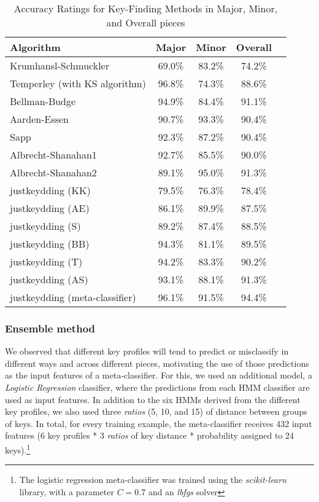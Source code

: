 \documentclass[sigconf]{acmart}
\begin{document}
\begin{table}[ht]
  \caption{Accuracy Ratings for Key-Finding Methods in Major, Minor, and Overall pieces}
  \label{tab:results}
  \begin{tabular}{lcccc}
    \toprule
    Algorithm & Major & Minor & Overall\\
    \midrule
    Krumhansl-Schmuckler & 69.0\% & 83.2\% & 74.2\%\\
    Temperley (with KS algorithm) & 96.8\% & 74.3\% & 88.6\%\\
    Bellman-Budge & 94.9\% & 84.4\% & 91.1\%\\
    Aarden-Essen & 90.7\% & 93.3\% & 90.4\%\\
    Sapp & 92.3\% & 87.2\% & 90.4\%\\
    Albrecht-Shanahan1 & 92.7\% & 85.5\% & 90.0\%\\
    Albrecht-Shanahan2 & 89.1\% & 95.0\% & 91.3\%\\
    \midrule
    justkeydding (KK) & 79.5\% & 76.3\% & 78.4\%\\
    justkeydding (AE) & 86.1\% & 89.9\% & 87.5\%\\
    justkeydding (S) & 89.2\% & 87.4\% & 88.5\%\\
    justkeydding (BB) & 94.3\% & 81.1\% & 89.5\%\\
    justkeydding (T) & 94.2\% & 83.3\% & 90.2\%\\
    justkeydding (AS) & 93.1\% & 88.1\% & 91.3\%\\
    \midrule
    justkeydding (meta-classifier) &  96.1\% & 91.5\% & 94.4\%\\
    \bottomrule
\end{tabular}
\end{table}
\subsubsection{Ensemble method}
We observed that different key profiles will tend to predict or misclassify in different ways and across different pieces, motivating the use of those predictions as the input features of a meta-classifier. For this, we used an additional model, a \emph{Logistic Regression} classifier, where the predictions from each HMM classifier are used as input features. In addition to the six HMMs derived from the different key profiles, we also used three \emph{ratios} (5, 10, and 15) of distance between groups of keys. In total, for every training example, the meta-classifier receives 432 input features (6 key profiles * 3 \emph{ratios} of key distance * probability assigned to 24 keys).\footnote{The logistic regression meta-classifier was trained using the \emph{scikit-learn} \cite{pedregosa2011} library, with a parameter $C=0.7$ and an \emph{lbfgs} solver}
\end{document}
